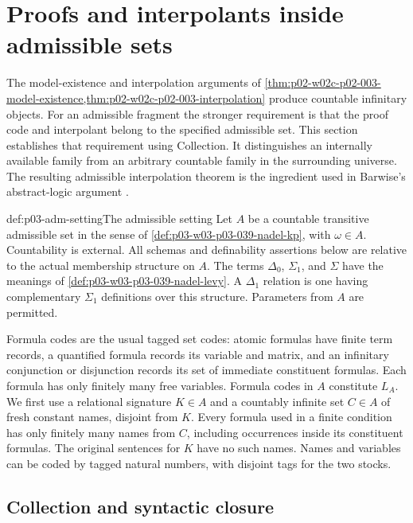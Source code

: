 \section{Proofs and interpolants inside admissible sets}
\label{sec:p03-admissible-proof-closure}

The model-existence and interpolation arguments of
\cref{thm:p02-w02c-p02-003-model-existence,thm:p02-w02c-p02-003-interpolation}
produce countable infinitary objects. For an admissible fragment the
stronger requirement is that the proof code and interpolant belong to
the specified admissible set. This section establishes that requirement
using Collection. It distinguishes an internally available family from
an arbitrary countable family in the surrounding universe.
The resulting admissible interpolation theorem is the ingredient used
in Barwise's abstract-logic argument
\cite[Part~II, \S4, p.~261]{Barwise1974Axioms}.

\begin{hbconvention}{def:p03-adm-setting}{The admissible setting}
Let \(A\) be a countable transitive admissible set in the sense of
\cref{def:p03-w03-p03-039-nadel-kp}, with \(\omega\in A\).
Countability is external. All schemas and definability assertions below
are relative to the actual membership structure on \(A\).
The terms \(\Delta_0\), \(\Sigma_1\), and \(\Sigma\) have the meanings
of \cref{def:p03-w03-p03-039-nadel-levy}. A \(\Delta_1\) relation is one
having complementary \(\Sigma_1\) definitions over this structure.
Parameters from \(A\) are permitted.

Formula codes are the usual tagged set codes: atomic formulas have
finite term records, a quantified formula records its variable and
matrix, and an infinitary conjunction or disjunction records its set of
immediate constituent formulas. Each formula has only finitely many free
variables. Formula codes in \(A\) constitute \(L_A\).
We first use a relational signature \(K\in A\) and a countably infinite
set \(C\in A\) of fresh constant names, disjoint from \(K\). Every
formula used in a finite condition has only finitely many names from
\(C\), including occurrences inside its constituent formulas.
The original sentences for \(K\) have no such names. Names and variables
can be coded by tagged natural numbers, with disjoint tags for the two
stocks.
\end{hbconvention}

\subsection{Collection and syntactic closure}

